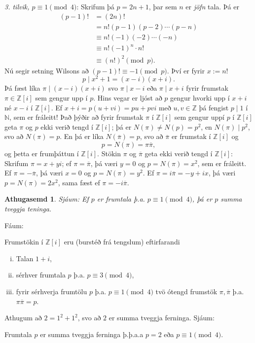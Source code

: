 \documentclass[a4paper,icelandic,11pt]{book}
\theoremstyle{plain}
\newtheorem*{ath}{Athugasemd}
\newcommand{\N}{\mathbb{N}}
\newcommand{\Z}{\mathbb{Z}}
\begin{document}
\emph{3. tilvik, $p\equiv 1\pmod 4$}: Skrifum þá $p=2n+1$, þar sem $n$ er
\emph{jöfn} tala. Þá er
\begin{align*}
  (p-1)!
  &= (2n)! \\
  &= n!(p-1)(p-2)\cdots (p-n) \\
  &\equiv n! (-1)(-2)\cdots(-n) \\
  &\equiv n! (-1)^n \cdot n! \\
  &\equiv (n!)^2 \pmod p.
\end{align*}
Nú segir setning Wilsons að $(p-1)!\equiv -1 \pmod p$. Því er fyrir $x:=n!$ 
\[ p\mid x^2 + 1 = (x-i)(x+i) .\] 
Þá fæst líka $\pi \mid (x-i)(x+i)$ svo $\pi \mid x-i$ eða $\pi \mid x+i$ fyrir
frumstak $\pi\in\Z[i]$ sem gengur upp í $p$. Hins vegar er ljóst að $p$ gengur
hvorki upp í $x+i$ né $x-i$ í $\Z[i]$. Ef $x+i=p(u+vi)=pu+pvi$ með $u,v\in\Z$ þá
fengist $p\mid 1$ í $\N$, sem er fráleitt! Það þýðir að fyrir frumstak $\pi$ í
$\Z[i]$ sem gengur uppí $p$ í $\Z[i]$ geta $\pi$ og $p$ ekki verið tengd í
$\Z[i]$; þá er $N(\pi)\neq N(p) = p^2$, en $N(\pi)\mid p^2$, svo að $N(\pi) =
p$. En þá er líka $N(\overline \pi)=p$, svo að $\overline\pi$ er frumstak í $\Z[i]$ og 
\[ p = N(\pi) = \pi\overline\pi, \]
og þetta er frumþáttun í $\Z[i]$. Stökin $\pi$ og $\overline \pi$ geta ekki verið
tengd í $\Z[i]$: Skrifum $\pi = x+yi$; ef $\pi=\overline \pi$, þá væri $y=0$ og
$p=N(\pi)=x^2$, sem er fráleitt. Ef $\pi = -\overline \pi$, þá væri $x=0$ og
$p=N(\pi)=y^2$. Ef $\pi=i\overline \pi=-y+ix$, þá væri $p=N(\pi)=2x^2$, sama fæst ef
$\pi = -i\overline\pi$.
\begin{ath}
  Sjáum: Ef $p$ er frumtala þ.a. $p\equiv 1\pmod 4$, þá er $p$ summa tveggja
  teninga.
\end{ath}
Fáum:
\begin{setn}
  Frumstökin í $\Z[i]$ eru (burstéð frá tengslum) eftirfarandi
  \begin{enumerate}[(i)]
    \item Talan $1+i$,
    \item sérhver frumtala $p$ þ.a. $p\equiv 3\pmod 4$,
    \item fyrir sérhverja frumtölu $p$ þ.a. $p\equiv 1\pmod 4$ tvö ótengd
      frumstök $\pi,\overline\pi$ þ.a. $\pi\overline\pi = p$.
  \end{enumerate}
\end{setn}
Athugum að $2=1^2+1^2$, svo að $2$ er summa tveggja ferninga. Sjáum:
\begin{setn}
  Frumtala $p$ er summa tveggja ferninga þ.þ.a.a $p=2$ eða $p\equiv 1\pmod 4$.
\end{setn}
\end{document}
